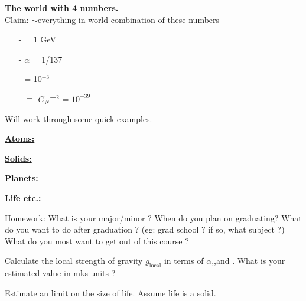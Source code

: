 \textbf{The world with 4 numbers.}\\
\underline{Claim:} $\sim$everything in world combination of these numbers\\
\begin{itemize}
\item[-]\mp = 1 GeV 
\item[-]$\alpha$ = 1/137
\item[-]\me = 10$^{-3}$ \GeV
\item[-]\aG $\equiv$ $G_N \mp^2$ = $10^{-39}$
\end{itemize}

Will work through some quick examples.

\underline{\textbf{Atoms:}}



\underline{\textbf{Solids:}}


\underline{\textbf{Planets:}}

\underline{\textbf{Life etc.:}}

Homework:
What is your major/minor ? 
When do you plan on graduating?
What do you want to do after graduation ? (eg: grad school ? if so, what subject ?)
What do you most want to get out of this course ? 

Calculate the local strength of gravity $g_{\textrm{local}}$ in terms of $\alpha$,\aG,\mp and \me.
What is your estimated value in mks units ?

Estimate an limit on the size of life.
Assume life is a solid. 

 




